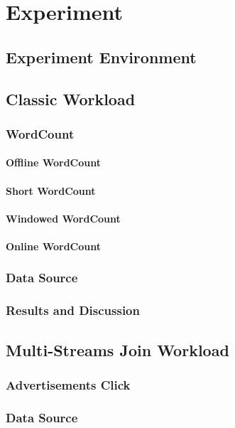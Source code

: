 \chapter{Experiment}
\label{chapter:experiment}

\section{Experiment Environment}
\label{sec:triton}

\section{Classic Workload}
\subsection{WordCount}
\subsubsection{Offline WordCount}
\subsubsection{Short WordCount}
\subsubsection{Windowed WordCount}
\subsubsection{Online WordCount}

\subsection{Data Source}
\subsection{Results and Discussion}

\section{Multi-Streams Join Workload}
\subsection{Advertisements Click}
\subsection{Data Source}
